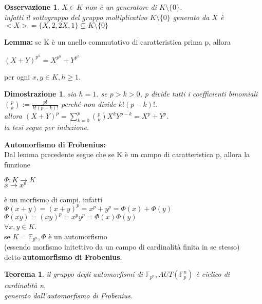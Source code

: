 \documentclass[a4paper,12pt]{article}
\theoremstyle{def}
\theoremstyle{prop}
\theoremstyle{esempio}
\theoremstyle{dimostrazione}
\newtheorem*{dimostrazione}{Dimostrazione}
\theoremstyle{teo}
\newtheorem*{teorema}{Teorema}
\theoremstyle{osservazione}
\newtheorem*{osservazione}{Osservazione}
\begin{document}
\begin{osservazione}
    \(X \in K\) non è un generatore di \(K \setminus \{0\}\).\\
    infatti il sottogruppo del gruppo moltiplicativo \(K \setminus \{0\}\) generato da \(X\) è\\
    \(<X> = \{X, 2, 2X, 1\} \subsetneq K \setminus \{0\}\)\\
\end{osservazione}

\newpage

\textbf{Lemma:} se K è un anello commutativo di caratteristica prima p, allora
\begin{center}
    \((X + Y)^{p^h} = X^{p^h} + Y^{p^h}\)
\end{center}
per ogni \(x, y \in K, h \geq 1\).

\begin{dimostrazione}
    sia \(h = 1\). se \(p > k > 0\), p divide tutti i coefficienti binomiali\\
    \(\binom{p}{k} := \frac{p!}{k!(p-k)!}\) perché non divide \(k!(p-k)!\).\\
    allora \((X + Y)^p = \sum_{k=0}^{p} \binom{p}{k} X^k Y^{p-k} = X^p + Y^p\).\\
    la tesi segue per induzione.\\
\end{dimostrazione}

\textbf{Automorfismo di Frobenius:}\\
Dal lemma precedente segue che se K è un campo di caratteristica p, allora la funzione 
\begin{center}
    \(\Phi : K \rightarrow K\)\\
    \(x \rightarrow x^p\)
\end{center}
è un morfismo di campi. infatti\\
\(\Phi(x + y) = (x + y)^p = x^p + y^p = \Phi(x) + \Phi(y)\)\\
\(\Phi(xy) = (xy)^p = x^p y^p = \Phi(x) \Phi(y)\)\\
\(\forall x,y \in K\).\\
se \(K = \mathbb{F}_{p^n}, \Phi\) è un automorfismo\\
(essendo morfismo initettivo da un campo di cardinalità finita in se stesso)\\
detto \textbf{automorfismo di Frobenius}.

\begin{teorema}
    il gruppo degli automorfismi di \(\mathbb{F}_{p^n}, AUT(\mathbb{F}_p^n)\) è ciclico di cardinalità n,\\
    generato dall'automorfismo di Frobenius.
\end{teorema}
\end{document}
